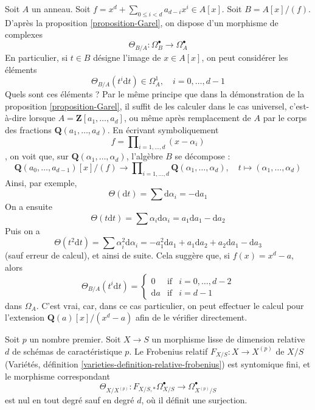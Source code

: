 \begin{example}
\label{example-Garel}
Soit $A$ un anneau. Soit $f = x^d + \sum_{0 \leq i < d} a_{d - i} x^i \in A[x]$.
Soit $B = A[x]/(f)$. D'après la proposition \ref{proposition-Garel},
on dispose d'un morphisme de complexes
$$
\Theta_{B/A} : \Omega^\bullet_B \longrightarrow \Omega^\bullet_A
$$
En particulier, si $t \in B$ désigne l'image de $x \in A[x]$,
on peut considérer les éléments
$$
\Theta_{B/A}(t^i\text{d}t) \in \Omega^1_A,\quad i = 0, \ldots, d - 1
$$
Quels sont ces éléments ? Par le même principe que dans la démonstration de la
proposition \ref{proposition-Garel}, il suffit de les calculer
dans le cas universel, c'est-à-dire lorsque $A = \mathbf{Z}[a_1, \ldots, a_d]$,
ou même après remplacement de $A$ par le corps des fractions
$\mathbf{Q}(a_1, \ldots, a_d)$. En écrivant symboliquement
$$
f = \prod\nolimits_{i = 1, \ldots, d} (x - \alpha_i)
$$,
on voit que, sur $\mathbf{Q}(\alpha_1, \ldots, \alpha_d)$,
l'algèbre $B$ se décompose :
$$
\mathbf{Q}(a_0, \ldots, a_{d - 1})[x]/(f) 
\longrightarrow
\prod\nolimits_{i = 1, \ldots, d} \mathbf{Q}(\alpha_1, \ldots, \alpha_d),
\quad
t \longmapsto (\alpha_1, \ldots, \alpha_d)
$$
Ainsi, par exemple,
$$
\Theta(\text{d}t) = \sum \text{d} \alpha_i = - \text{d}a_1
$$
On a ensuite
$$
\Theta(t\text{d}t) = \sum \alpha_i \text{d}\alpha_i =
a_1 \text{d} a_1 - \text{d}a_2
$$
Puis on a
$$
\Theta(t^2\text{d}t) = \sum \alpha_i^2 \text{d}\alpha_i =
- a_1^2 \text{d} a_1 + a_1 \text{d}a_2 + a_2 \text{d}a_1 - \text{d}a_3
$$
(sauf erreur de calcul), et ainsi de suite. Cela suggère que,
si $f(x) = x^d - a$, alors
$$
\Theta_{B/A}(t^i\text{d}t) =
\left\{
\begin{matrix}
0 & \text{if} & i = 0, \ldots, d - 2 \\
\text{d}a & \text{if} & i = d - 1
\end{matrix}
\right.
$$
dans $\Omega_A$. C'est vrai, car, dans ce cas particulier, on peut effectuer
le calcul pour l'extension $\mathbf{Q}(a)[x]/(x^d - a)$
afin de le vérifier directement.
\end{example}

\begin{lemma}
\label{lemma-Garel-map-frobenius-smooth-char-p}
Soit $p$ un nombre premier. Soit $X \to S$ un morphisme lisse
de dimension relative $d$ de schémas de caractéristique $p$.
Le Frobenius relatif $F_{X/S} : X \to X^{(p)}$ de $X/S$
(Variétés, définition \ref{varieties-definition-relative-frobenius})
est syntomique fini, et le morphisme correspondant
$$
\Theta_{X/X^{(p)}} :
F_{X/S, *}\Omega^\bullet_{X/S} \to \Omega^\bullet_{X^{(p)}/S}
$$
est nul en tout degré sauf en degré $d$, où il définit une
surjection.
\end{lemma}

